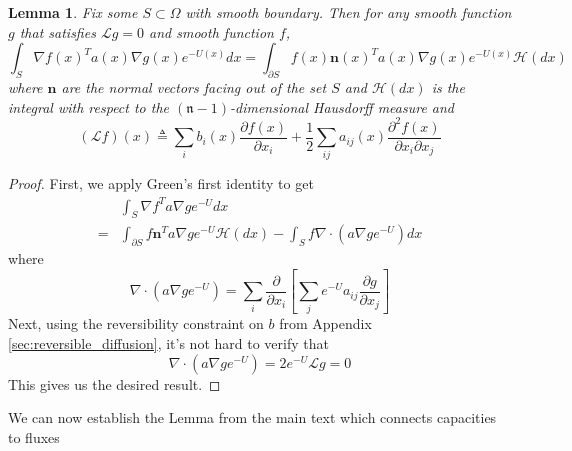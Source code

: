 \documentclass[english, aip, jcp, priprint, graphicx,floatfix]{revtex4-1}
\newtheorem{lemma}{Lemma}
\theoremstyle{plain}
\theoremstyle{definition}
\theoremstyle{plain}
\newcommand{\dimension}{{\mathfrak{n}}}
\newcommand{\hausdorffmeasure}{\mathscr{H}(dx)}
\begin{document}
\begin{lemma}  \label{lem:greenident}Fix some $S \subset \Omega$ with smooth boundary.  Then for any smooth function $g$ that satisfies $\mathcal{L}g = 0$ and smooth function $f$,
\begin{equation*}
\int_{S} \nabla f(x)^T a(x) \nabla g(x) e^{-U(x)}dx = \int_{\partial S} f(x) \mathbf{n}(x)^T a(x) \nabla g(x) e^{-U(x)}\hausdorffmeasure
\end{equation*}
where $\mathbf{n}$ are the normal vectors facing out of the set $S$ and $\hausdorffmeasure$ is the integral with respect to the $(\dimension-1)$-dimensional Hausdorff measure and 
\[
(\mathcal{L}f)(x) \triangleq \sum_i b_i(x) \frac{\partial f (x)}{\partial x_i} + 
    \frac{1}{2} \sum_{ij}a_{ij}(x)\frac{\partial^2 f(x)}{\partial x_i \partial x_j} 
\]
\end{lemma}
\begin{proof}
First, we apply Green's first identity to get
\begin{align*}
	 &\int_{S} \nabla f^T a \nabla g e^{-U} dx\\
	=&\int_{\partial S}f \textbf{n}^T a \nabla g e^{-U} \hausdorffmeasure - \int_{S} f \nabla \cdot (a \nabla g e^{-U}) dx
\end{align*}
where
\begin{equation*}
	\nabla \cdot (a \nabla g e^{-U}) = \sum_{i}\frac{\partial}{\partial x_i}\left[\sum_{j}e^{-U}a_{i j}\frac{\partial g}{\partial x_j}\right]
\end{equation*}
Next, using the reversibility constraint on $b$ from Appendix \ref{sec:reversible_diffusion}, it's not hard to verify that $$
\begin{equation*}
	\nabla \cdot (a \nabla g e^{-U}) = 2e^{-U}\mathcal{L} g = 0
\end{equation*}
This gives us the desired result.
\end{proof}

We can now establish the Lemma from the main text which connects capacities to fluxes
\end{document}

